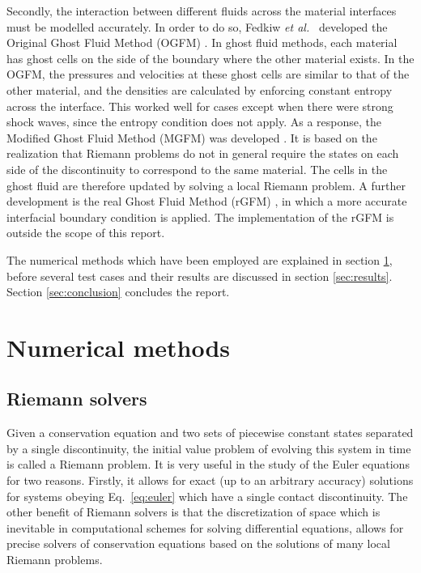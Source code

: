 \documentclass[final,3p,twocolumn,times]{elsarticle}
\begin{document}
Secondly, the interaction between different fluids across the material
interfaces must be modelled accurately. In order to do so, Fedkiw \emph{ et
al.\ } developed the Original Ghost Fluid Method (OGFM)
\cite{fedkiw1999nonoscillatory}. In ghost fluid methods, each material has
ghost cells on the side of the boundary where the other material exists. In the
OGFM, the pressures and velocities at these ghost cells are similar to that of
the other material, and the densities are calculated by enforcing constant
entropy across the interface. This worked well for cases except when there were
strong shock waves, since the entropy condition does not apply. As a response,
the Modified Ghost Fluid Method (MGFM) was developed \cite{liu2003ghost,
sambasivan2009ghost}. It is based on the realization that Riemann problems do
not in general require the states on each side of the discontinuity to
correspond to the same material. The cells in the ghost fluid are therefore
updated by solving a local Riemann problem. A further development is the real
Ghost Fluid Method (rGFM) \cite{wang2006real}, in which a more accurate
interfacial boundary condition is applied. The implementation of the rGFM is
outside the scope of this report. 

The numerical methods which have been employed are explained in section
\ref{sec:numerical}, before several test cases and their results are discussed
in section \ref{sec:results}. Section \ref{sec:conclusion} concludes the
report.

\section{Numerical methods}
\label{sec:numerical}

\subsection{Riemann solvers}
\label{subsec:riemann}

Given a conservation equation and two sets of piecewise constant states
separated by a single discontinuity, the initial value problem of evolving this
system in time is called a Riemann problem. It is very useful in the study of
the Euler equations for two reasons. Firstly, it allows for exact (up to an
arbitrary accuracy) solutions for systems obeying Eq.\  \eqref{eq:euler} which
have a single contact discontinuity. The other benefit of Riemann solvers is
that the discretization of space which is inevitable in computational schemes
for solving differential equations, allows for precise solvers of conservation
equations based on the solutions of many local Riemann problems. 
\end{document}
